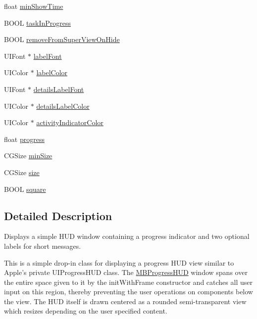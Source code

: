 \begin{DoxyCompactItemize}
\item 
float \hyperlink{interface_m_b_progress_h_u_d_a9946e4b0b16d75f070ff0cbcc50226ef}{min\+Show\+Time}
\item 
B\+O\+O\+L \hyperlink{interface_m_b_progress_h_u_d_a6077ea42c37c18b3058ed63ac10ede8f}{task\+In\+Progress}
\item 
B\+O\+O\+L \hyperlink{interface_m_b_progress_h_u_d_a36639aa18a70f2734942695c32ec5e91}{remove\+From\+Super\+View\+On\+Hide}
\item 
U\+I\+Font $\ast$ \hyperlink{interface_m_b_progress_h_u_d_ae61e736a34f341f4190b065f19010af8}{label\+Font}
\item 
U\+I\+Color $\ast$ \hyperlink{interface_m_b_progress_h_u_d_a04eba696a66f65d28b485bb5f0a940cd}{label\+Color}
\item 
U\+I\+Font $\ast$ \hyperlink{interface_m_b_progress_h_u_d_af070a363d323d8eb0285e38d398b51c2}{details\+Label\+Font}
\item 
U\+I\+Color $\ast$ \hyperlink{interface_m_b_progress_h_u_d_ace929217bd7673159f063d5b8e80b080}{details\+Label\+Color}
\item 
U\+I\+Color $\ast$ \hyperlink{interface_m_b_progress_h_u_d_a39469370af56b4ee74cde5b471b3a9b0}{activity\+Indicator\+Color}
\item 
float \hyperlink{interface_m_b_progress_h_u_d_a4c8328617d11efd1f5452032246ca97f}{progress}
\item 
C\+G\+Size \hyperlink{interface_m_b_progress_h_u_d_a69c6b2cad533d6fe7d90df02bf7f8b0c}{min\+Size}
\item 
C\+G\+Size \hyperlink{interface_m_b_progress_h_u_d_a0c987a2e4026910e21167e95fee7b4e4}{size}
\item 
B\+O\+O\+L \hyperlink{interface_m_b_progress_h_u_d_a4bf7271b213e304259aa7d97f7cb1849}{square}
\end{DoxyCompactItemize}


\subsection{Detailed Description}
Displays a simple H\+U\+D window containing a progress indicator and two optional labels for short messages.

This is a simple drop-\/in class for displaying a progress H\+U\+D view similar to Apple's private U\+I\+Progress\+H\+U\+D class. The \hyperlink{interface_m_b_progress_h_u_d}{M\+B\+Progress\+H\+U\+D} window spans over the entire space given to it by the init\+With\+Frame constructor and catches all user input on this region, thereby preventing the user operations on components below the view. The H\+U\+D itself is drawn centered as a rounded semi-\/transparent view which resizes depending on the user specified content.

